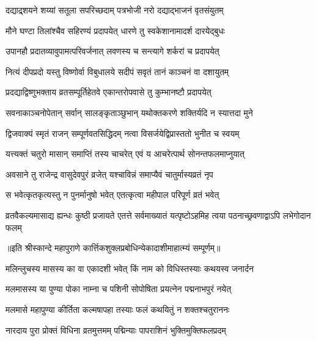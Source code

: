 \twolineshloka
{दद्याद्र्शयने शय्यां सतूला सपरिच्छदाम्}
{पत्रभोजी नरो दद्याद्भाजनं वृतसंयुतम्} %

\twolineshloka
{मौने घण्टा तिलांश्चैव सहिरण्यं प्रदापयेत्}
{धारणे तु स्वकेशानामादर्श दारयेद्बुधः} %

\twolineshloka
{उपानहौ प्रदातव्यावुपामत्परिवर्जनात्}
{लवणस्य च सन्त्यागे शर्करां च प्रदापयेत्} %

\twolineshloka
{नित्यं दीपप्रदो यस्तु विष्णोर्वा विबुधालये}
{सदीपं सवृतं तानं काञ्चनं वा दशायुतम्} %

\twolineshloka
{प्रदद्याद्विष्णुभक्ताय व्रतसम्पूर्तिहेतवे}
{एकान्तरोपवासे तु कुम्भानष्टौ प्रदापयेत्} %

\twolineshloka
{सवनाकाञ्चनोपेतान् सर्वान् सालङ्कृताञ्छुभान्}
{यथोक्तकरणे शक्तिर्यदि न स्यात्तदा मुने} %

\twolineshloka
{द्विजवाक्यं स्मृतं राजन् सम्पूर्णवतसिद्धिदम्}
{नत्वा विसर्जयेद्विप्रास्ततो भुनीत च स्वयम्} %

\twolineshloka
{यत्त्यक्तं चतुरो मासान् समाप्तिं तस्य चाचरेत्}
{एवं य आचरेत्पार्थ सोनन्तफलमाप्नुयात्} %

\twolineshloka
{अवसाने तु राजेन्द्र वासुदेवपुरं व्रजेत्}
{यश्चाविन्नं समाप्यैवं चातुर्मास्यव्रतं नृप} %

\twolineshloka
{स भवेत्कृतकृत्यस्तु न पुनर्मानुषो भवेत्}
{एतत्कृत्वा महीपाल परिपूर्ण व्रतं भवेत्} %

\threelineshloka
{व्रतवैकल्यमासाद्य ह्यन्धः कुष्ठी प्रजायते}
{एतत्ते सर्वमाख्यातं यत्पृष्टोऽहमिह त्वया}
{पठनाच्छ्रवणाद्वाऽपि लभेगोदान फलम्} %

॥इति श्रीस्कान्दे महापुराणे कार्त्तिकशुक्लप्रबोधिन्येकादाशीमाहात्म्यं सम्पूर्णम्॥


\hyperref[sec:ekadashi_mahatmyam_vrata_raja]{\closesub}
\clearpage

\label{sec:vrata-raja-purushottama-shukla-kamada}


\twolineshloka
{मलिन्लुचस्य मासस्य का वा एकादशी भवेत्}
{किं नाम को विधिस्तस्याः कथयस्व जनार्दन} %


\twolineshloka
{मलमासस्य या पुण्या पोका नाम्ना च पशिनी}
{सोपोषिता प्रयत्नेन पद्मनाभपुरं नयेत्} %

\twolineshloka
{मलमासे महापुण्या कीर्तिता कल्मषापहा}
{तस्याः फलं कथयितुं न शक्तश्चतुराननः} %

\twolineshloka
{नारदाय पुरा प्रोक्तं विधिना व्रतमुत्तमम्}
{पद्मिन्याः पापराशिनं भुक्तिमुक्तिफलप्रदम्} %

